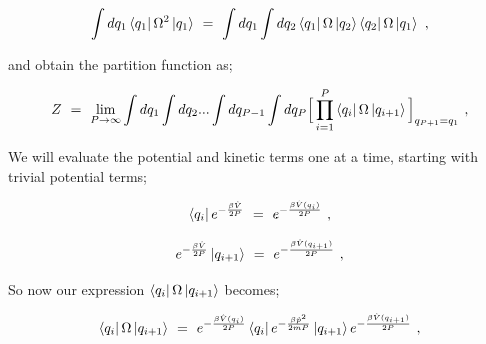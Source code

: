 \documentclass{article}
\begin{document}
\begin{equation} \label{eb-eq-1-193}
\int dq_1 \bra{q_1} \Omega^2 \ket{q_1} \hspace{0.125cm} = \hspace{0.125cm} \int dq_1 \int dq_2 \bra{q_1} \Omega \ket{q_2} \bra{q_2} \Omega \ket{q_1} \hspace{0.125cm} , 
\end{equation}

and obtain the partition function as;

\begin{equation} \label{eb-eq-1-194}
Z \hspace{0.125cm} = \hspace{0.125cm}  \lim_{P \rightarrow \infty} \int dq_1 \int dq_2 ... \int dq_{P - 1} \int dq_P \Big[ \prod_{i=1}^{P} \bra{q_i} \Omega  \ket{q_{i+1}} \Big]_{q_{P+1} = q_1} \hspace{0.125cm} , 
\end{equation}

We will evaluate the potential and kinetic terms one at a time, starting with trivial potential terms;

\begin{equation} \label{eb-eq-1-195}
\bra{q_i} e^{-\frac{\beta \hat{V}}{2 P}} \hspace{0.125cm} = \hspace{0.125cm} e^{-\frac{\beta \hat{V}(q_i)}{2 P}} \hspace{0.125cm} , 
\end{equation}

\begin{equation} \label{eb-eq-1-196}
e^{-\frac{\beta \hat{V}}{2 P}} \ket{q_{i+1}} \hspace{0.125cm} = \hspace{0.125cm} e^{-\frac{\beta \hat{V}(q_{i+1})}{2 P}} \hspace{0.125cm} , 
\end{equation}

So now our expression \begin{math} \bra{q_i} \Omega \ket{q_{i+1}} \end{math} becomes;

\begin{equation} \label{eb-eq-1-197}
\bra{q_i} \Omega \ket{q_{i+1}} \hspace{0.125cm} = \hspace{0.125cm}  e^{-\frac{\beta \hat{V}(q_i)}{2 P}} \bra{q_i} e^{- \frac{\beta \hat{p}^2}{2 m P}} \ket{q_{i+1}} e^{-\frac{\beta \hat{V}(q_{i+1})}{2 P}}  \hspace{0.125cm} , 
\end{equation}
\end{document}

